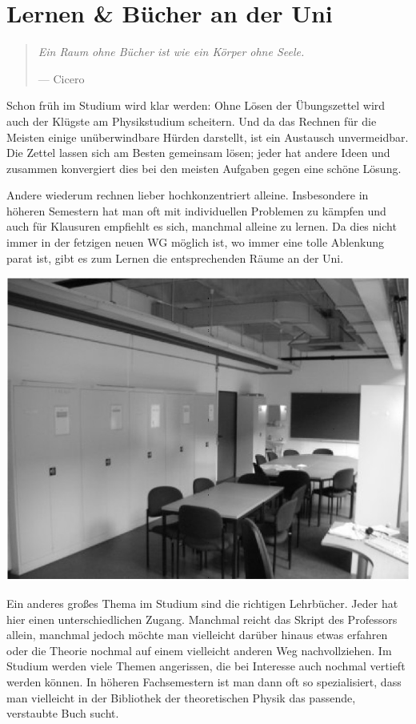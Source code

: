 \section{Lernen \& Bücher an der Uni}
\begin{multicols*}{2}
\begin{quote}
	\textit{Ein Raum ohne Bücher ist wie ein Körper ohne Seele.}
	
	\hfill--- Cicero
\end{quote}
Schon früh im Studium wird klar werden: Ohne Lösen der Übungszettel wird auch der Klügste am Physikstudium scheitern.
Und da das Rechnen für die Meisten einige unüberwindbare Hürden darstellt, ist ein Austausch unvermeidbar.
Die Zettel lassen sich am Besten gemeinsam lösen; jeder hat andere Ideen und zusammen konvergiert dies bei den meisten Aufgaben gegen eine schöne Lösung.

Andere wiederum rechnen lieber hochkonzentriert alleine.
Insbesondere in höheren Semestern hat man oft mit individuellen Problemen zu kämpfen und auch für Klausuren empfiehlt es sich, manchmal alleine zu lernen.
Da dies nicht immer in der fetzigen neuen WG möglich ist, wo immer eine tolle Ablenkung parat ist, gibt es zum Lernen die entsprechenden Räume an der Uni.

\includegraphics[width=\columnwidth]{res/buecher_studibib.png}

Ein anderes großes Thema im Studium sind die richtigen Lehrbücher.
Jeder hat hier einen unterschiedlichen Zugang.
Manchmal reicht das Skript des Professors allein, manchmal jedoch möchte man vielleicht darüber hinaus etwas erfahren oder die Theorie nochmal auf einem vielleicht anderen Weg nachvollziehen.
Im Studium werden viele Themen angerissen, die bei Interesse auch nochmal vertieft werden können.
In höheren Fachsemestern ist man dann oft so spezialisiert, dass man vielleicht in der Bibliothek der theoretischen Physik das passende, verstaubte Buch sucht.


\end{multicols*}
